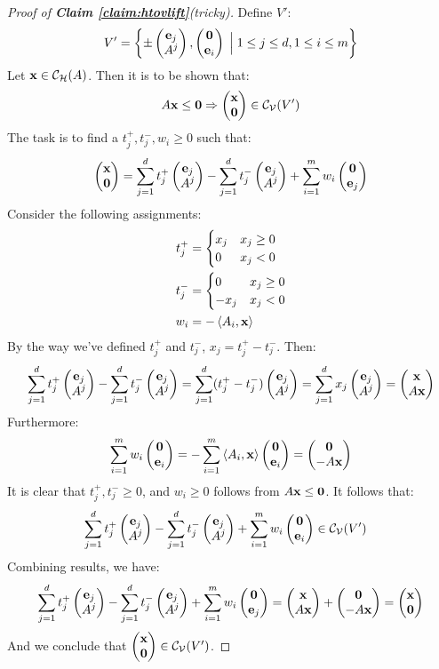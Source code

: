 \documentclass[a4,fleqn]{article}
\begin{document}
\begin{proof}[Proof of \textnormal{\textbf{Claim \ref{claim:htovlift}}}(tricky)]
Define $V'$:
\[ V' = \bset{\pm\svec{\e_j}{A^j}, \svec{\vec{0}}{\e_i} \Suchthat 1\leq j \leq d, 1 \leq i \leq m} \]
Let $\mathbf{x} \in \mathcal{C}_{\mathcal{H}}(A)$.  Then it is to be shown that:
\[ A\x \leq \vec{0} \Rightarrow \svec{\x}{\vec{0}} \in \CV(V') \]
The task is to find a $t_j^+,t_j^-,w_i \geq 0$ such that:
 \[ \svec{\x}{\vec{0}} = \sum_{j=1}^{d} t_j^+ \svec{\e_j}{A^j} -
                        \sum_{j=1}^{d} t_j^- \svec{\e_j}{A^j} +
                        \sum_{i=1}^{m} w_i \svec{\vec{0}}{\e_j} \]
Consider the following assignments:
\begin{align*}
  t_j^+ &= \begin{cases} x_j & x_j \geq 0 \\ 0   & x_j < 0 \end{cases} \\
  t_j^- &= \begin{cases} 0   & x_j \geq 0 \\ -x_j & x_j < 0 \end{cases} \\
  w_i   &= -\left\langle A_i, \mathbf{x} \right\rangle
\end{align*}
By the way we've defined $t_j^+$ and $t_j^-$, $x_j = t_j^+ - t_j^-$.  Then:
\begin{align*} \sum_{j=1}^{d} t_j^+ \svec{\e_j}{A^j} -
                 \sum_{j=1}^{d} t_j^- \svec{\e_j}{A^j} =
               \sum_{j=1}^{d} (t_j^+ - t_j^-) \svec{\e_j}{A^j} = 
               \sum_{j=1}^{d} x_j \svec{\e_j}{A^j} =
               \svec{\x}{A\x}
\end{align*}
Furthermore:
\[ \sum_{i=1}^{m} w_i \svec{\vec{0}}{\e_i} 
      = -\sum_{i=1}^{m} \dotproduct{A_i}{\x} \svec{\vec{0}}{\e_i} 
      = \svec{\vec{0}}{-A\x} \]
It is clear that $t_j^+,t_j^- \geq 0$, and $w_i \geq 0$ follows from $A\mathbf{x} \leq \mathbf{0}$.  It follows that:
\begin{align*} &\sum_{j=1}^{d} t_j^+ \svec{\e_j}{A^j} -
                 \sum_{j=1}^{d} t_j^- \svec{\e_j}{A^j} +
                 \sum_{i=1}^{m} w_i \svec{\vec{0}}{\e_i} \in \CV(V')
\end{align*}
Combining results, we have:
 \[ \sum_{j=1}^{d} t_j^+ \svec{\e_j}{A^j} -
      \sum_{j=1}^{d} t_j^- \svec{\e_j}{A^j} +
      \sum_{i=1}^{m} w_i \svec{\vec{0}}{\e_j} =
    \svec{\x}{A\x} + \svec{\vec{0}}{-A\x}  = \svec{\x}{\vec{0}} \]
And we conclude that $\svec{\x}{\vec{0}} \in \CV(V')$.


\end{proof}
\end{document}
